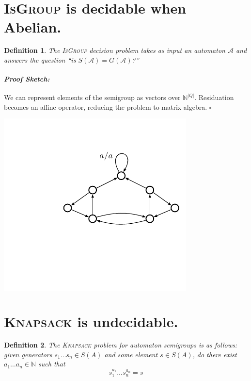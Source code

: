 \documentclass[a0]{a0poster}
\newcommand{\N}{\mathbb{N}}
\newcommand{\A}{\mathcal{A}}
\newcommand{\defndecprob}[1]{{\color{NavyBlue}\textsc{#1}}}
\theoremstyle{pleasant}
\newtheorem{definition}{Definition}
\newenvironment{proofsketch}{\paragraph{\large \normalfont \textit{Proof Sketch:}}}{\hfill$\square$}
\newcommand{\0}{\underline{0}}
\newcommand{\1}{\underline{1}}
\newcommand{\2}{\underline{2}}
\begin{document}
\begin{multicols}{3}
\section*{\textsc{IsGroup} is decidable when Abelian.}

\begin{definition}
  The \defndecprob{IsGroup} decision problem takes as input an automaton
  $\A$ and answers the question ``is $S(\A) = G(\A)$?''
\end{definition}

\begin{proofsketch} 
  We can represent elements of the semigroup as vectors over
  $\mathbb{N}^{|Q|}$. Residuation becomes an affine operator, reducing
  the problem to matrix algebra.
\end{proofsketch} 

\vspace{1em}
\begin{center}
\includegraphics[scale=1.5]{../figures/bowtie}
\end{center}
\vspace{-1em}

\section*{\textsc{Knapsack} is undecidable.}

\begin{definition}
  The \defndecprob{Knapsack} problem for automaton semigroups is as
  follows: given generators $s_1\ldots s_n \in S(A)$ and some element
  $s \in S(A)$, do there exist $a_1\ldots a_n \in \N$ such
  that \[s_1^{a_1}\ldots s_n^{a_n} = s \]
\end{definition}


\end{multicols}
\end{document}
